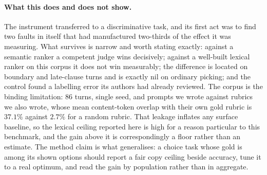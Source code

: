 \paragraph{What this does and does not show.} The instrument transferred to a discriminative task, and its first act was to find two faults in itself that had manufactured two-thirds of the effect it was measuring. What survives is narrow and worth stating exactly: against a semantic ranker a competent judge wins decisively; against a well-built lexical ranker on this corpus it does not win measurably; the difference is located on boundary and late-clause turns and is exactly nil on ordinary picking; and the control found a labelling error its authors had already reviewed. The corpus is the binding limitation: 86 turns, single seed, and prompts we wrote against rubrics we also wrote, whose mean content-token overlap with their own gold rubric is $37.1\%$ against $2.7\%$ for a random rubric. That leakage inflates any surface baseline, so the lexical ceiling reported here is high for a reason particular to this benchmark, and the gain above it is correspondingly a floor rather than an estimate. The method claim is what generalises: a choice task whose gold is among its shown options should report a fair copy ceiling beside accuracy, tune it to a real optimum, and read the gain by population rather than in aggregate.
